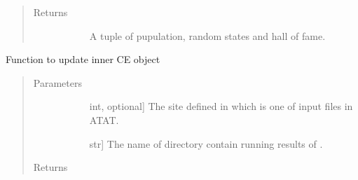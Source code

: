 \documentclass[letterpaper,10pt,english]{sphinxmanual}
\begin{document}
\begin{fulllineitems}
\begin{fulllineitems}
\begin{quote}
\begin{description}
\begin{description}
\end{description}

\item[{Returns}] \leavevmode\begin{description}
\item[{}] \leavevmode
A tuple of pupulation, random states and hall of fame.

\end{description}

\end{description}\end{quote}

\end{fulllineitems}


\begin{fulllineitems}
\label{\detokenize{pygace.examples.sto:pygace.examples.sto.sto_gace.STOApp.update_ce}}
Function to update inner CE object
\begin{quote}\begin{description}
\item[{Parameters}] \leavevmode\begin{description}
\item[{}] \leavevmode{[}int, optional{]}
The site defined in  which is one of input files in ATAT.

\item[{}] \leavevmode{[}str{]}
The name of directory contain running results of .

\end{description}

\item[{Returns}] \leavevmode\begin{description}
\item[{}] \leavevmode
\end{description}

\end{description}\end{quote}

\end{fulllineitems}


\end{fulllineitems}
\end{document}

